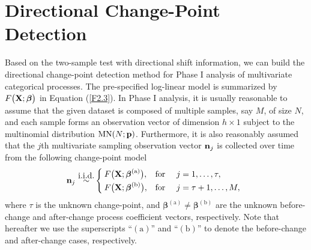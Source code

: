\section{Directional Change-Point Detection}\label{sec4.3}

Based on the two-sample test with directional shift information, we can build the
directional change-point detection method for Phase I analysis of multivariate
categorical processes. The pre-specified log-linear model is summarized by
$F\big({\bf X}; \boldsymbol\beta\big)$ in Equation (\ref{F2.3}). In Phase I analysis, it is
usually reasonable to assume that the given dataset is composed of multiple samples,
say $M$, of size $N$, and each sample forms an observation vector of dimension
$h\times 1$ subject to the multinomial distribution $\mbox{MN}(N;{\bf p})$.
Furthermore, it is also reasonably assumed that the $j$th multivariate sampling
observation vector ${\bf n}_j$ is collected over time from the following
change-point model
\begin{align*}
{\bf n}_j\ {\mathop{\sim}\limits^{\mbox{i.i.d.}}}\left\{\hspace{-0.1cm}
\begin{array}{ll} F\big({\bf X};\bm\beta^{(\mathrm{a})}\big), &
{\mathrm{for\ }} \quad j=1,\ldots,\tau,\\[0.1cm]
F\big({\bf X};\bm\beta^{(\mathrm{b})}\big), & {\mathrm {for\ }} \quad
j=\tau+1,\ldots,M,
\end{array}\right.
\end{align*}
where $\tau$ is the unknown change-point, and $\bm\beta^{(\mathrm{a})} \neq
\bm\beta^{(\mathrm{b})}$ are the unknown before-change and after-change process
coefficient vectors, respectively. Note that hereafter we use the superscripts
``$(\mathrm{a})$'' and ``$(\mathrm{b})$'' to denote the before-change and
after-change cases, respectively.

